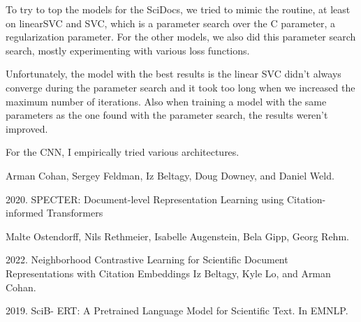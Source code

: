 \documentclass[conference]{IEEEtran}
\begin{document}
To try to top the models for the SciDocs, we tried to mimic the routine, at least on linearSVC and SVC, which is a parameter search over the C parameter, a regularization parameter. For the other models, we also did this parameter search search, mostly experimenting with various loss functions.

Unfortunately, the model with the best results is the linear SVC didn't always converge during the parameter search and it took too long when we increased the maximum number of iterations. Also when training a model with the same parameters as the one found with the parameter search, the results weren't improved.

For the CNN, I empirically tried various architectures.



\begin{thebibliography}{00}
Arman Cohan, Sergey Feldman, Iz Beltagy, Doug Downey, and Daniel Weld. 

2020. SPECTER: Document-level Representation Learning using Citation-informed Transformers

 Malte Ostendorff, Nils Rethmeier, Isabelle Augenstein, Bela Gipp, Georg Rehm.

2022. Neighborhood Contrastive Learning for Scientific Document Representations with Citation Embeddings
 Iz Beltagy, Kyle Lo, and Arman Cohan.

2019. SciB- ERT: A Pretrained Language Model for Scientific Text. In EMNLP.

\end{thebibliography}
\vspace{12pt}
\end{document}

